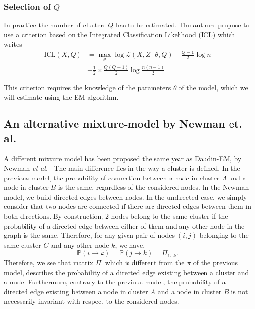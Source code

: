 \documentclass[switch, 12pt]{article}
\begin{document}
\begin{multicols}{2}
    \subsubsection{Selection of $Q$}
    \label{subsubsec:icl}

    In practice the number of clusters $Q$ has to be estimated. The authors propose to use a criterion based on the Integrated Classification Likelihood (ICL) which writes :
    \begin{equation}
        \begin{aligned}
            \mathrm{ICL}(X, Q) & =\max_\theta\log \mathcal{L}(X, Z \ |\ \theta, Q)-\frac{Q-1}{2}\log n \\&-\frac{1}{2}\times\frac{Q(Q+1)}{2}\log\frac{n(n-1)}{2}
        \end{aligned}
    \end{equation}

    This criterion requires the knowledge of the parameters $\theta$ of the model, which we will estimate using the EM algorithm.

    \subsection{An alternative mixture-model by Newman et. al.}
    \label{subsec:newman}

    A different mixture model has been proposed the same year as Daudin-EM, by Newman \textit{et al.} \cite{newman}. The main difference lies in the way a cluster is defined. In the previous model, the probability of connection between a node in cluster $A$ and a node in cluster $B$ is the same, regardless of the considered nodes.
    \newline
    \newline
    In the Newman model, we build directed edges between nodes. In the undirected case, we simply consider that two nodes are connected if there are directed edges between them in both directions. By construction, $2$ nodes belong to the same cluster if the probability of a directed edge between either of them and any other node in the graph is the same. Therefore, for any given pair of nodes $(i, j)$ belonging to the same cluster $C$ and any other node $k$, we have,
    \begin{equation}
        \mathbb{P}(i \rightarrow k) = \mathbb{P}(j \rightarrow k) = \Pi_{C, k}.
    \end{equation}
    Therefore, we see that matrix $\Pi$, which is different from the $\pi$ of the previous model, describes the probability of a directed edge existing between a cluster and a node. Furthermore, contrary to the previous model, the probability of a directed edge existing between a node in cluster $A$ and a node in cluster $B$ is not necessarily invariant with respect to the considered nodes.


\end{multicols}
\end{document}
